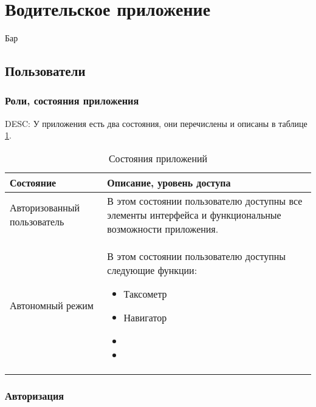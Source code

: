\section{Водительское приложение}

Бар


    \subsection{Пользователи}

        \subsubsection{Роли, состояния приложения}

        		DESC: У приложения есть два состояния, они перечислены и описаны в таблице \ref{app_state}. 

               \begin{table}[!h]
               \begin{center}
               \label{app_state}
               \caption {Состояния приложений}
               \setlength{\extrarowheight}{2mm}
               \begin{tabular}{|p{5cm}|p{10cm}|}
                   \hline     \textbf{Состояние}&\textbf{Описание, уровень доступа} \\ [2mm]

                   \hline   Авторизованный пользователь & В этом состоянии пользователю доступны все элементы интерфейса и функциональные возможности приложения.\\ [2mm]
                   \hline   Автономный режим & В этом состоянии пользователю доступны следующие функции: \begin{itemize} \item Таксометр \item Навигатор \item \item\end{itemize}\\ [2mm]
                    \hline
               \end{tabular}
               \end{center}
               \end{table}

    	\subsubsection{Авторизация}

